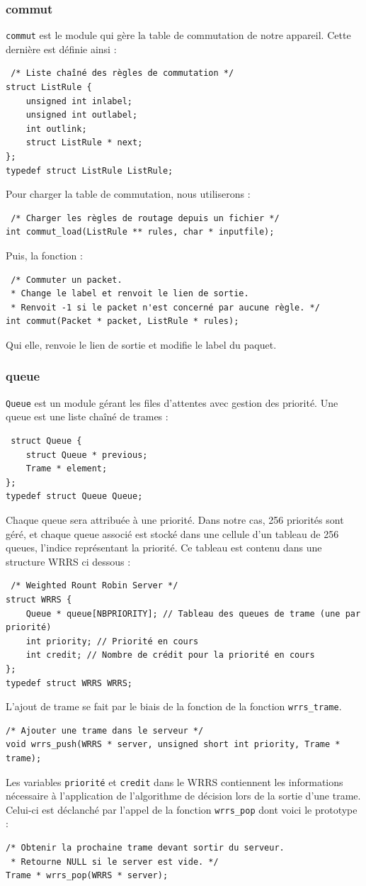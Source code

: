 \documentclass[a4paper,11pt]{article}
\begin{document}
\subsubsection{commut}
\texttt{commut} est le module qui gère la table de commutation de notre appareil. Cette dernière est définie ainsi :
\begin{verbatim}
 /* Liste chaîné des règles de commutation */
struct ListRule {
    unsigned int inlabel;
    unsigned int outlabel;
    int outlink;
    struct ListRule * next;
};
typedef struct ListRule ListRule;
\end{verbatim}
Pour charger la table de commutation, nous utiliserons :
\begin{verbatim}
 /* Charger les règles de routage depuis un fichier */
int commut_load(ListRule ** rules, char * inputfile);
\end{verbatim}
Puis, la fonction :
\begin{verbatim}
 /* Commuter un packet.
 * Change le label et renvoit le lien de sortie.
 * Renvoit -1 si le packet n'est concerné par aucune règle. */
int commut(Packet * packet, ListRule * rules);
\end{verbatim}
Qui elle, renvoie le lien de sortie et modifie le label du paquet.




\subsubsection{queue}
\texttt{Queue} est un module gérant les files d'attentes avec gestion
des priorité. Une queue est une liste chaîné de trames :
\begin{verbatim}
 struct Queue {
    struct Queue * previous;
    Trame * element;
};
typedef struct Queue Queue;
\end{verbatim}
Chaque queue sera attribuée à une priorité. Dans notre cas, 256 priorités
sont géré, et chaque queue associé est stocké dans une cellule d'un
tableau de 256 queues, l'indice représentant la priorité.
Ce tableau est contenu dans une structure WRRS ci dessous :
\begin{verbatim}
 /* Weighted Rount Robin Server */
struct WRRS {
    Queue * queue[NBPRIORITY]; // Tableau des queues de trame (une par priorité)
    int priority; // Priorité en cours
    int credit; // Nombre de crédit pour la priorité en cours
};
typedef struct WRRS WRRS;
\end{verbatim}
L'ajout de trame se fait par le biais de la fonction de la fonction
\texttt{wrrs\_trame}.
\begin{verbatim}
/* Ajouter une trame dans le serveur */
void wrrs_push(WRRS * server, unsigned short int priority, Trame * trame);
\end{verbatim}
Les variables \texttt{priorité} et \texttt{credit} dans le WRRS
contiennent les informations nécessaire à l'application de l'algorithme
de décision lors de la sortie d'une trame. Celui-ci est déclanché par
l'appel de la fonction \texttt{wrrs\_pop} dont voici le prototype :
\begin{verbatim}
/* Obtenir la prochaine trame devant sortir du serveur.
 * Retourne NULL si le server est vide. */
Trame * wrrs_pop(WRRS * server);
\end{verbatim}
\end{document}
